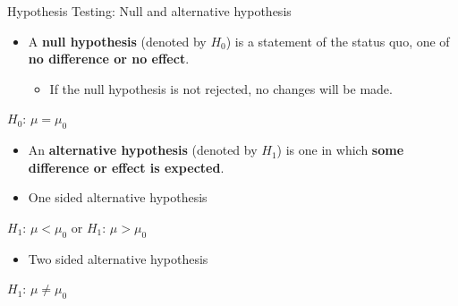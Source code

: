 \documentclass[
  ignorenonframetext,
]{beamer}
\providecommand{\tightlist}{%
  \setlength{\itemsep}{0pt}\setlength{\parskip}{0pt}}
\begin{document}
\begin{frame}{Hypothesis Testing: Null and alternative hypothesis}
\label{hypothesis-testing-null-and-alternative-hypothesis}
\begin{itemize}
\tightlist
\item
  A \textbf{null hypothesis} (denoted by \(H_0\)) is a statement of the
  status quo, one of \textbf{no difference or no effect}.

  \begin{itemize}
  \tightlist
  \item
    If the null hypothesis is not rejected, no changes will be made.
  \end{itemize}
\end{itemize}

\(H_0\): \(\mu = \mu_0\)

\begin{itemize}
\item
  An \textbf{alternative hypothesis} (denoted by \(H_1\)) is one in
  which \textbf{some difference or effect is expected}.
\item
  One sided alternative hypothesis
\end{itemize}

\(H_1\): \(\mu < \mu_0\) or \(H_1\): \(\mu > \mu_0\)

\begin{itemize}
\tightlist
\item
  Two sided alternative hypothesis
\end{itemize}

\(H_1\): \(\mu \neq \mu_0\)
\end{frame}
\end{document}
